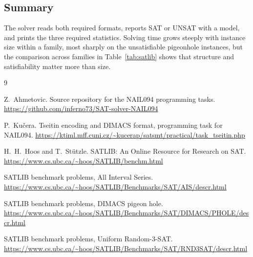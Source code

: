 \documentclass[11pt,a4paper]{article}
\begin{document}
\subsection*{Summary}

The solver reads both required formats, reports SAT or UNSAT with a model, and
prints the three required statistics. Solving time grows steeply with instance
size within a family, most sharply on the unsatisfiable pigeonhole instances,
but the comparison across families in Table~\ref{tab:satlib} shows that
structure and satisfiability matter more than size.

\begin{thebibliography}{9}

Z.~Ahmetovic.
\newblock Source repository for the NAIL094 programming tasks.
\newblock \url{https://github.com/inferno73/SAT-solver-NAIL094}

P.~Ku\v{c}era.
\newblock Tseitin encoding and DIMACS format, programming task for NAIL094.
\newblock \url{https://ktiml.mff.cuni.cz/~kucerap/satsmt/practical/task_tseitin.php}

H.~H.~Hoos and T.~St\"utzle.
\newblock SATLIB: An Online Resource for Research on SAT.
\newblock \url{https://www.cs.ubc.ca/~hoos/SATLIB/benchm.html}

SATLIB benchmark problems, All Interval Series.
\newblock \url{https://www.cs.ubc.ca/~hoos/SATLIB/Benchmarks/SAT/AIS/descr.html}

SATLIB benchmark problems, DIMACS pigeon hole.
\newblock \url{https://www.cs.ubc.ca/~hoos/SATLIB/Benchmarks/SAT/DIMACS/PHOLE/descr.html}

SATLIB benchmark problems, Uniform Random-3-SAT.
\newblock \url{https://www.cs.ubc.ca/~hoos/SATLIB/Benchmarks/SAT/RND3SAT/descr.html}

\end{thebibliography}
\end{document}
